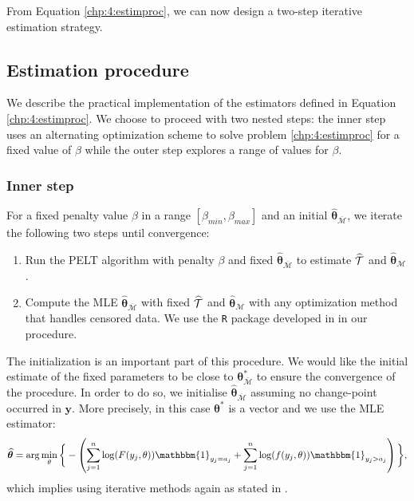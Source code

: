 From Equation \eqref{chp:4:estimproc}, we can now design a two-step iterative estimation strategy.


\subsection{Estimation procedure}\label{chp:4:3:2}


We describe the practical implementation of the estimators defined in Equation \eqref{chp:4:estimproc}. We choose to proceed with two nested steps: the inner step uses an alternating optimization scheme to solve problem \eqref{chp:4:estimproc} for a fixed value of $\beta$ while the outer step explores a range of values for $\beta$.

\subsubsection{Inner step}\label{chp:4:3:2:1}

For a fixed penalty value $\beta$ in a range $[\beta_{min},\beta_{max}]$ and an initial $\widehat{\bm\theta}_{\overline{\mathcal{M}}}$, we iterate the following two steps until convergence: 
\begin{enumerate}
\item Run the PELT algorithm with penalty $\beta$ and fixed $\widehat{\bm\theta}_{{\overline{\mathcal{M}}}}$ to estimate $\widehat{{\mathcal T}}$ and $\widehat{\bm\theta}_{\mathcal{M}}$.
\item Compute the MLE $\widehat{\bm\theta}_{{\overline{\mathcal{M}}}}$ with fixed $\widehat{{\mathcal T}}$ and $\widehat{\bm\theta}_{\mathcal{M}}$ with any optimization method that handles censored data. We use the \texttt{R} package developed in \cite{delignette2015} in our procedure.  
\end{enumerate} 

The initialization is an important part of this procedure. We would like the initial estimate of the fixed parameters to be close to $\bm\theta^*_{{\overline{\mathcal{M}}}}$ to ensure the convergence of the procedure. In order to do so, we initialise $\widehat{\bm\theta}_{\overline{\mathcal{M}}}$ assuming no change-point occurred in $\bm y$.  More precisely, in this case $\bm\theta^*$ is a vector and we use the MLE estimator:  
\begin{equation}\label{chp:4:init}
\widehat{\bm\theta} = \arg\min_{\theta}\bigg\{ - \left(\sum_{j=1}^{n}\log(F(y_j,\theta))\mathbbm{1}_{y_j=a_j}+\sum_{j=1}^{n}\log(f(y_j,\theta))\mathbbm{1}_{y_j>a_j}\right)\bigg\},
\end{equation}   
which implies using iterative methods again as stated in \cite{cohen1965maximum}.

